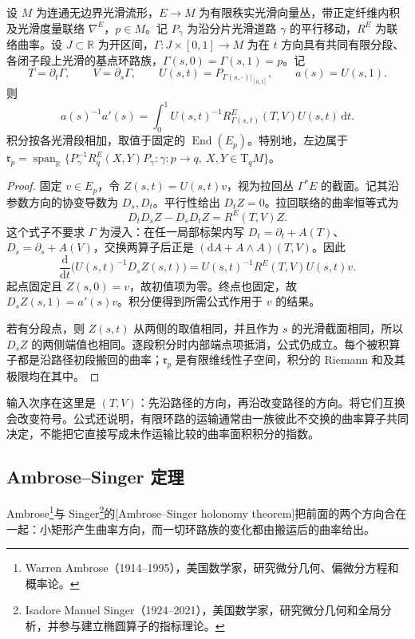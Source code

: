 \begin{proposition}\label{g3:prop:holonomy-variation}
	设 \(M\) 为连通无边界光滑流形，\(E\to M\) 为有限秩实光滑向量丛，带正定纤维内积及光滑度量联络 \(\nabla^E\)，\(p\in M\)。记 \(P_\gamma\) 为沿分片光滑道路 \(\gamma\) 的平行移动，\(R^E\) 为联络曲率。设 \(J\subset\mathbb R\) 为开区间，\(\Gamma:J\times[0,1]\to M\) 为在 \(t\) 方向具有共同有限分段、各闭子段上光滑的基点环路族，\(\Gamma(s,0)=\Gamma(s,1)=p\)。记
	\[
		T=\partial_t\Gamma,\qquad V=\partial_s\Gamma,\qquad
		U(s,t)=P_{\Gamma(s,\cdot)|_{[0,t]}},\qquad a(s)=U(s,1).
	\]
	则
	\begin{equation}\label{g3:eq:holonomy-variation}
		a(s)^{-1}a'(s)
		=\int_0^1 U(s,t)^{-1}R^E_{\Gamma(s,t)}(T,V)U(s,t)\,\mathrm dt.
	\end{equation}
	积分按各光滑段相加，取值于固定的 \(\operatorname{End}(E_p)\)。特别地，左边属于 \(\mathfrak r_p=\operatorname{span}_{\mathbb R}\{P_\gamma^{-1}R^E_q(X,Y)P_\gamma:\gamma:p\to q,\ X,Y\in\mathrm T_qM\}\)。
\end{proposition}
\begin{proof}
	固定 \(v\in E_p\)，令 \(Z(s,t)=U(s,t)v\)，视为拉回丛 \(\Gamma^*E\) 的截面。记其沿参数方向的协变导数为 \(D_s,D_t\)。平行性给出 \(D_tZ=0\)。拉回联络的曲率恒等式为
	\[
		D_tD_sZ-D_sD_tZ=R^E(T,V)Z.
	\]
	这个式子不要求 \(\Gamma\) 为浸入：在任一局部标架内写 \(D_t=\partial_t+A(T)\)、\(D_s=\partial_s+A(V)\)，交换两算子后正是 \((\mathrm dA+A\wedge A)(T,V)\)。因此
	\[
		\frac{\mathrm d}{\mathrm dt}\bigl(U(s,t)^{-1}D_sZ(s,t)\bigr)
		=U(s,t)^{-1}R^E(T,V)U(s,t)v.
	\]
	起点固定且 \(Z(s,0)=v\)，故初值项为零。终点也固定，故 \(D_sZ(s,1)=a'(s)v\)。积分便得到所需公式作用于 \(v\) 的结果。

	若有分段点，则 \(Z(s,t)\) 从两侧的取值相同，并且作为 \(s\) 的光滑截面相同，所以 \(D_sZ\) 的两侧端值也相同。逐段积分时内部端点项抵消，公式仍成立。每个被积算子都是沿路径初段搬回的曲率；\(\mathfrak r_p\) 是有限维线性子空间，积分的 Riemann 和及其极限均在其中。
\end{proof}

输入次序在这里是 \((T,V)\)：先沿路径的方向，再沿改变路径的方向。将它们互换会改变符号。公式还说明，有限环路的运输通常由一族彼此不交换的曲率算子共同决定，不能把它直接写成未作运输比较的曲率面积积分的指数。

\subsection{Ambrose–Singer 定理}
\label{g3:subsec:0501:06}

Ambrose\footnote{Warren Ambrose（1914--1995），美国数学家，研究微分几何、偏微分方程和概率论。}与 Singer\footnote{Isadore Manuel Singer（1924--2021），美国数学家，研究微分几何和全局分析，并参与建立椭圆算子的指标理论。}的[Ambrose--Singer holonomy theorem]把前面的两个方向合在一起：小矩形产生曲率方向，而一切环路族的变化都由搬运后的曲率给出。

